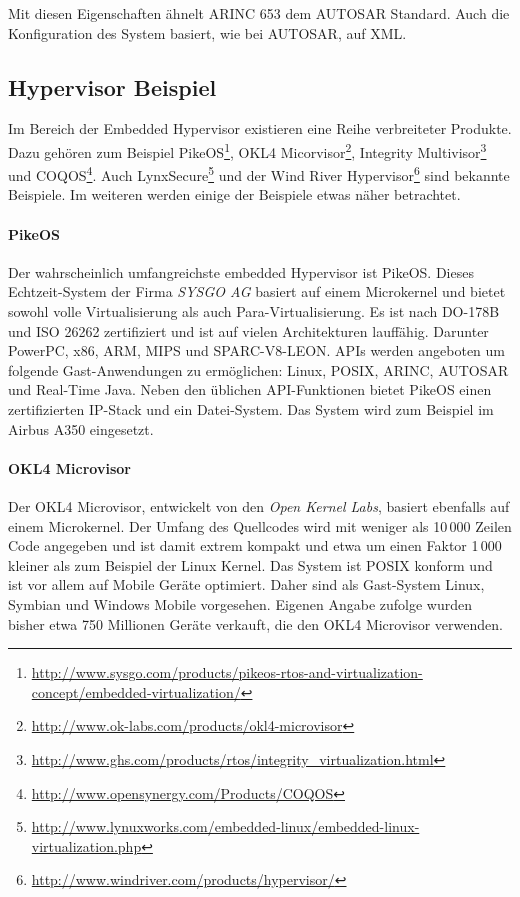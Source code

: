 \documentclass[
  a4paper,					    %
  twoside,
  DIV=calc,     				%
  bibliography=totoc,
  cleardoublepage=empty,
  ngerman,     					%
  final       					%
]{scrbook}
\begin{document}
Mit diesen Eigenschaften ähnelt ARINC 653 dem AUTOSAR Standard. Auch die Konfiguration des System basiert, wie bei AUTOSAR, auf XML.


\subsection{Hypervisor Beispiel}
Im Bereich der Embedded Hypervisor existieren eine Reihe verbreiteter Produkte. Dazu gehören zum Beispiel PikeOS\footnote{\url{http://www.sysgo.com/products/pikeos-rtos-and-virtualization-concept/embedded-virtualization/}}, OKL4 Micorvisor\footnote{\url{http://www.ok-labs.com/products/okl4-microvisor}}, Integrity Multivisor\footnote{\url{http://www.ghs.com/products/rtos/integrity_virtualization.html}} und COQOS\footnote{\url{http://www.opensynergy.com/Products/COQOS}}. Auch LynxSecure\footnote{\url{http://www.lynuxworks.com/embedded-linux/embedded-linux-virtualization.php}} und der Wind River Hypervisor\footnote{\url{http://www.windriver.com/products/hypervisor/}} sind bekannte Beispiele. Im weiteren werden einige der Beispiele etwas näher betrachtet.

\paragraph{PikeOS}
Der wahrscheinlich umfangreichste embedded Hypervisor ist PikeOS. Dieses Echtzeit-System der Firma \emph{SYSGO AG} basiert auf einem Microkernel und bietet sowohl volle Virtualisierung als auch Para-Virtualisierung. Es ist nach DO-178B und ISO 26262 zertifiziert und ist auf vielen Architekturen lauffähig. Darunter PowerPC, x86, ARM, MIPS und SPARC-V8-LEON. APIs werden angeboten um folgende Gast-Anwendungen zu ermöglichen: Linux, POSIX, ARINC, AUTOSAR und Real-Time Java. Neben den üblichen API-Funktionen bietet PikeOS einen zertifizierten IP-Stack und ein Datei-System. Das System wird zum Beispiel im Airbus A350 eingesetzt.

\paragraph{OKL4 Microvisor}
Der OKL4 Microvisor, entwickelt von den \emph{Open Kernel Labs}, basiert ebenfalls auf einem Microkernel. Der Umfang des Quellcodes wird mit weniger als 10\,000 Zeilen Code angegeben und ist damit extrem kompakt und etwa um einen Faktor 1\,000 kleiner als zum Beispiel der Linux Kernel.\cite{wiki:loc} Das System ist POSIX konform und ist vor allem auf Mobile Geräte optimiert. Daher sind als Gast-System Linux, Symbian und Windows Mobile vorgesehen. Eigenen Angabe zufolge wurden bisher etwa 750 Millionen Geräte verkauft, die den OKL4 Microvisor verwenden.\cite{okl4}
\end{document}
